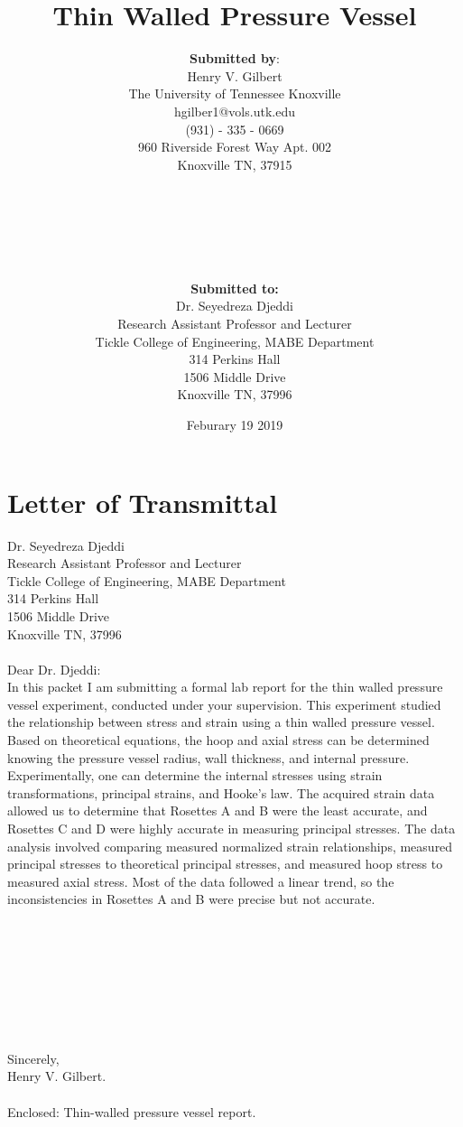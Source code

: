 \documentclass[12pt]{article}
\title{Thin Walled Pressure Vessel}
\author{
	\textbf{Submitted by}: \\
	Henry V. Gilbert \\
	The University of Tennessee Knoxville \\
	hgilber1@vols.utk.edu \\
	(931) - 335 - 0669 \\
	960 Riverside Forest Way
	Apt. 002 \\
	Knoxville TN, 37915\\ \\ \\ \\ \\ \\ \\ 
	\textbf{Submitted to: }\\ 
	Dr. Seyedreza Djeddi \\
	Research Assistant Professor and Lecturer \\
	Tickle College of Engineering, MABE Department \\
	314 Perkins Hall \\
	1506 Middle Drive \\
	Knoxville TN, 37996 \\
	}
\date {Feburary 19 2019}
\begin{document}
\maketitle

\newpage
\section*{Letter of Transmittal}
Dr. Seyedreza Djeddi \\
Research Assistant Professor and Lecturer \\
Tickle College of Engineering, MABE Department \\
314 Perkins Hall \\
1506 Middle Drive \\
Knoxville TN, 37996 \\ \\
Dear Dr. Djeddi: \\ 

In this packet I am submitting a formal lab report for the thin walled pressure vessel experiment, 
conducted under your supervision. This experiment studied the relationship between stress and
strain using a thin walled pressure vessel. Based on theoretical equations, the hoop and 
axial stress can be determined knowing the pressure vessel radius, wall thickness, and internal
pressure. Experimentally, one can determine the internal stresses using strain transformations,
principal strains, and Hooke's law. The acquired strain data allowed us to determine that Rosettes A 
and B were the least accurate, and Rosettes C and D were highly accurate in measuring 
principal stresses. The data analysis involved comparing measured normalized strain relationships,
measured principal stresses to theoretical principal stresses, and measured hoop stress to 
measured axial stress. Most of the data followed a linear trend, so the inconsistencies in Rosettes A 
and B were precise but not accurate. \\  \\ \\ \\  \\ \\ \\ \\ 
\\ 
Sincerely, \\
Henry V. Gilbert. \\ \\ 
Enclosed: Thin-walled pressure vessel report. 
\end{document}
